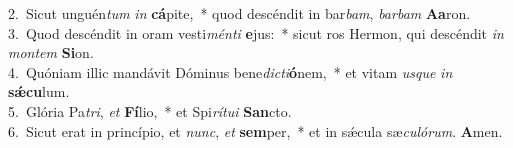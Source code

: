 {2.~}Sicut unguén\textit{tum} \textit{in} \textbf{cá}pite,~* quod descéndit in bar\textit{bam}, \textit{bar}\textit{bam} \textbf{A}\textbf{a}ron.\\
{3.~}Quod descéndit in oram vesti\textit{mén}\textit{ti} \textbf{e}jus:~* sicut ros Hermon, qui descéndit \textit{in} \textit{mon}\textit{tem} \textbf{Si}on.\\
{4.~}Quóniam illic mandávit Dóminus bene\textit{di}\textit{cti}\textbf{ó}nem,~* et vitam \textit{us}\textit{que} \textit{in} \textbf{sǽ}\textbf{cu}lum.\\
{5.~}Glória Pa\textit{tri}, \textit{et} \textbf{Fí}lio,~* et Spi\textit{rí}\textit{tu}\textit{i} \textbf{San}cto.\\
{6.~}Sicut erat in princípio, et \textit{nunc}, \textit{et} \textbf{sem}per,~* et in sǽcula sæ\textit{cu}\textit{ló}\textit{rum}. \textbf{A}men.\\
